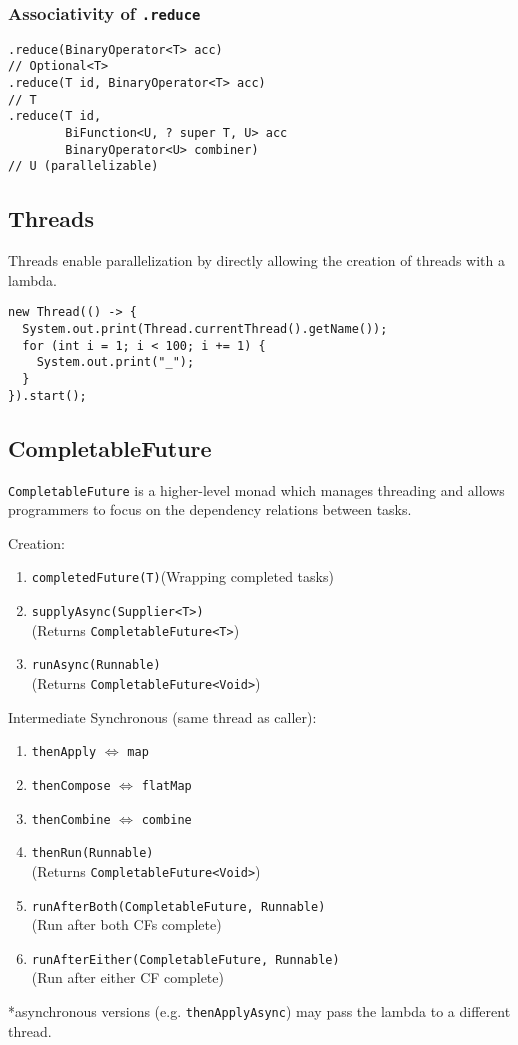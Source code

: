 \documentclass[12pt, a4paper]{article}
\begin{document}
\begin{multicols*}{3}
\subsubsection{Associativity of \lstinline|.reduce|}
\begin{lstlisting}
.reduce(BinaryOperator<T> acc) 
// Optional<T>
.reduce(T id, BinaryOperator<T> acc) 
// T
.reduce(T id, 
        BiFunction<U, ? super T, U> acc
        BinaryOperator<U> combiner) 
// U (parallelizable)
\end{lstlisting}

\subsection{Threads}
Threads enable parallelization by directly allowing the creation of threads with a lambda.

\begin{lstlisting}
new Thread(() -> {
  System.out.print(Thread.currentThread().getName());
  for (int i = 1; i < 100; i += 1) {
    System.out.print("_");
  }
}).start();
\end{lstlisting}

\subsection{CompletableFuture}
\lstinline|CompletableFuture| is a higher-level monad which manages threading and allows programmers to focus on the dependency relations between tasks.

Creation:
\begin{enumerate}[\roman*.]
  \item \lstinline|completedFuture(T)|\hfill(Wrapping completed tasks)
  \item \lstinline|supplyAsync(Supplier<T>)|\\\hfill(Returns \lstinline|CompletableFuture<T>|)
  \item \lstinline|runAsync(Runnable)|\\\hfill(Returns \lstinline|CompletableFuture<Void>|)
\end{enumerate}

Intermediate Synchronous (same thread as caller):
\begin{enumerate}[\roman*.]
  \item \lstinline|thenApply| $\iff$ \lstinline|map|
  \item \lstinline|thenCompose| $\iff$ \lstinline|flatMap|
  \item \lstinline|thenCombine| $\iff$ \lstinline|combine|
  \item \lstinline|thenRun(Runnable)|\\\hfill(Returns \lstinline|CompletableFuture<Void>|)
  \item \lstinline|runAfterBoth(CompletableFuture, Runnable)|\\\hfill(Run after both CFs complete)
  \item \lstinline|runAfterEither(CompletableFuture, Runnable)|\\\hfill(Run after either CF complete)
\end{enumerate}
*asynchronous versions (e.g. \lstinline|thenApplyAsync|) may pass the lambda to a different thread. 



\end{multicols*}
\end{document}
